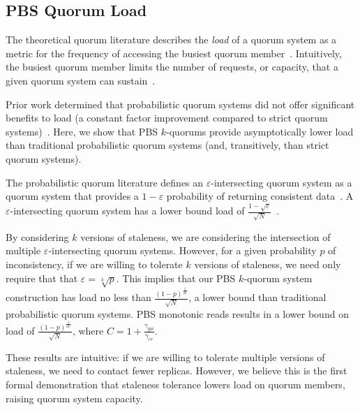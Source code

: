 \documentclass{vldb}
\begin{document}
\begin{appendix}
\section{PBS Quorum Load}
The theoretical quorum literature describes the \textit{load} of a quorum
system as a metric for the frequency of accessing the busiest quorum
member~\cite[Definition 3.2]{quorumsystems}.  Intuitively, the busiest
quorum member limits the number of requests, or capacity, that a given
quorum system can sustain~\cite[Corollary 3.9]{quorumsystems}.

Prior work determined that probabilistic quorum systems did not offer
significant benefits to load (a constant factor improvement compared
to strict quorum systems)~\cite{prob-quorum}.  Here, we show that PBS
$k$-quorums provide asymptotically lower load than traditional
probabilistic quorum systems (and, transitively, than strict quorum
systems).

The probabilistic quorum literature defines an
$\varepsilon$-intersecting quorum system as a quorum system that
provides a $1-\varepsilon$ probability of returning consistent
data~\cite[Definition 3.1]{prob-quorum}.  A $\varepsilon$-intersecting
quorum system has a lower bound load of
$\frac{1-\sqrt{\varepsilon}}{\sqrt{N}}$~\cite[Corollary
  3.12]{prob-quorum}.

By considering $k$ versions of staleness, we are considering the
intersection of multiple $\varepsilon$-intersecting quorum systems.
However, for a given probability $p$ of inconsistency, if we are
willing to tolerate $k$ versions of staleness, we need only require
that that $\varepsilon = \sqrt[k]{p}$.  This implies that our PBS
$k$-quorum system construction has load no less than
$\frac{(1-p)^{\frac{1}{2k}}}{\sqrt{N}}$, a lower bound than
traditional probabilistic quorum systems.  PBS monotonic reads results
in a lower bound on load of $\frac{(1-p)^{\frac{1}{2C}}}{\sqrt{N}}$, where
$C=1+\frac{\gamma_{gw}}{\gamma_{cr}}$.

These results are intuitive: if we are willing to tolerate multiple
versions of staleness, we need to contact fewer replicas.  However, we
believe this is the first formal demonstration that staleness
tolerance lowers load on quorum members, raising quorum system
capacity.


\end{appendix}
\end{document}
